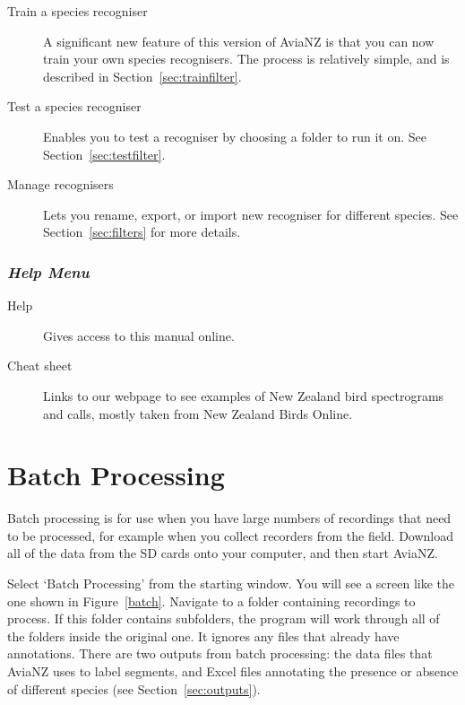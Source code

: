 \documentclass{article}
\begin{document}
\begin{description}
\item [Train a species recogniser] A significant new feature of this version of AviaNZ is that you can now train your own species recognisers. The process is relatively simple, and is described in Section~\ref{sec:trainfilter}.
\item [Test a species recogniser] Enables you to test a recogniser by choosing a folder to run it on. See Section~\ref{sec:testfilter}.
\item[Manage recognisers] Lets you rename, export, or import new recogniser for different species. See Section~\ref{sec:filters} for more details.
\end{description}

\subsubsection{{\em Help Menu}}

\begin{description}
\item [Help] Gives access to this manual online.
\item [Cheat sheet] Links to our webpage to see examples of New Zealand bird spectrograms and calls, mostly taken from New Zealand Birds Online.
\end{description}

\section{Batch Processing}
\label{sec:auto}

Batch processing is for use when you have large numbers of recordings that need to be processed, for example when you collect recorders from the field. Download all of the data from the SD cards onto your computer, and then start AviaNZ. 

Select `Batch Processing' from the starting window. You will see a screen like the one shown in Figure~\ref{batch}. Navigate to a folder containing recordings to process. If this folder contains subfolders, the program will work through all of the folders inside the original one. It ignores any files that already have annotations.  There are two outputs from batch processing: the data files that AviaNZ uses to label segments, and Excel files annotating the presence or absence of different species (see Section~\ref{sec:outputs}).
\end{document}
